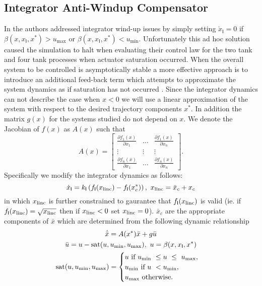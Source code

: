 \subsection{Integrator Anti-Windup Compensator}
\label{S:anti_windup}
In \cite{johnsen07:_inter_and_dampin_assig_passiv} the authors addressed integrator wind-up issues by simply setting
$\dot{x}_{\mathsf{I}}=0$ if $\beta(x,x_{\mathsf{I}},x^*) > u_{\max}$ or $\beta(x,x_{\mathsf{I}},x^*) <
u_{\min}$.  Unfortunately this ad hoc solution caused the simulation
to halt when evaluating their control law for the two tank and
four tank processes when actuator saturation occurred.  When the
overall system to be controlled is asymptotically 
stable a more effective approach is to introduce an additional
feed-back term which attempts to approximate the system dynamics as if
saturation has not occurred
\cite{fu10:_feedb_therm_contr_for_real_time_system}.  Since the
integrator dynamics can not describe the case when $x < 0$ we will use
a linear approximation of the system with respect to the desired
trajectory components $x^*$.  In addition the matrix $g(x)$ for the
systems studied do not depend on $x$.  We denote the Jacobian of
$f(x)$ as $A(x)$ such that 
\begin{equation*}
A(x)=\begin{bmatrix}
\frac{\partial f_1(x)}{\partial x_1} & \dots & \frac{\partial
f_1(x)}{\partial x_n}\\
\vdots & \vdots & \vdots\\
\frac{\partial f_n(x)}{\partial x_1} & \dots & \frac{\partial
f_n(x)}{\partial x_n}
\end{bmatrix}.
\end{equation*}
 Specifically we modify the integrator dynamics as follows:
\begin{equation*}
\dot{x}_{\mathsf{I}} = k_{\mathsf{I}} 
  \left ( f_{\mathsf{I}}(x_{\operatorname{linc}}) - f_{\mathsf{I}}(x^*_c) \right ),\
  x_{\operatorname{linc}} = \bar{x}_c + x_c 
\end{equation*}
in which $x_{\operatorname{linc}}$ is further constrained to gaurantee that
$f_{\mathsf{I}}(x_{\operatorname{linc}})$ is valid
(ie. if $f_{\mathsf{I}}(x_{\operatorname{linc}})=\sqrt{x_{\operatorname{linc}}}$ then if $x_{\operatorname{linc}}
< 0$ set $x_{\operatorname{linc}}=0$).  $\bar{x}_c$ are the appropriate components of $\bar{x}$ which
are determined from the following dynamic relationship
\begin{gather*}
\dot{\bar{x}} = A(x^*) \bar{x} + g \bar{u}\\
\bar{u} = u - \operatorname{sat}(u,u_{\min},u_{\max}),\ u =
\beta(x,x_{\mathsf{I}},x^*)\\
\operatorname{sat}(u,u_{\min},u_{\max})=\begin{cases}
u\ \text{if } u_{\min}\ \leq u\  \leq \ u_{\max}, \\
u_{\min}\ \text{if } u\ < u_{\min}, \\
u_{\max}\ \text{otherwise.}
\end{cases}
\end{gather*}

